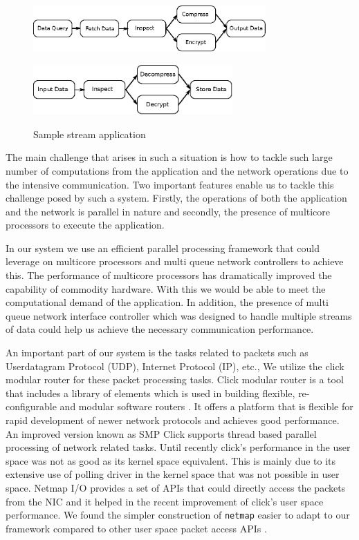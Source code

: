 \documentclass[conference]{IEEEtran}
\begin{document}
\begin{figure}[ht]
\centering
\subfigure
{
	\includegraphics[width=3.5in]{ip-data-proc}
}

\subfigure
{
	\includegraphics[width=3in]{op-data-proc}
}
\caption{Sample stream application}
\label{fig1}
\end{figure}

The main challenge that arises in such a situation is how to tackle such large number of computations from the application and the network operations due to the intensive communication. Two important features enable us to tackle this challenge posed by such a system. Firstly, the operations of both the application and the network is parallel in nature and secondly, the presence of multicore processors to execute the application. 

In our system we use an efficient parallel processing framework that could leverage on multicore processors and multi queue network controllers to achieve this. The performance of multicore processors has dramatically improved the capability of commodity hardware. With this we would be able to meet the computational demand of the application. In addition, the presence of multi queue network interface controller which was designed to handle multiple streams of data could help us achieve the necessary communication performance.

An important part of our system is the tasks related to packets such as Userdatagram Protocol (UDP), Internet Protocol (IP), etc., We utilize the click modular router for these packet processing tasks. Click modular router is a tool that includes a library of elements which is used in building flexible, re-configurable and modular software routers \cite{Kohler2000}. It offers a platform that is flexible for rapid development of newer network protocols and achieves good performance. An improved version known as SMP Click supports thread based parallel processing of network related tasks\cite{Chen:2001:FCP:647055.759948}. Until recently click's performance in the user space was not as good as its kernel space equivalent. This is mainly due to its extensive use of polling driver in the kernel space that was not possible in user space. Netmap I/O\cite{Rizzo:2012:RNI:2090147.2103536} provides a set of APIs that could directly access the packets from the NIC and it helped in the recent improvement of click's user space performance. We found the simpler construction of \texttt{netmap} easier to adapt to our framework compared to other user space packet access APIs \cite{Rizzo:2012:RNI:2090147.2103536} \cite{1564468} \cite{Krasnyansky}.   
\end{document}
